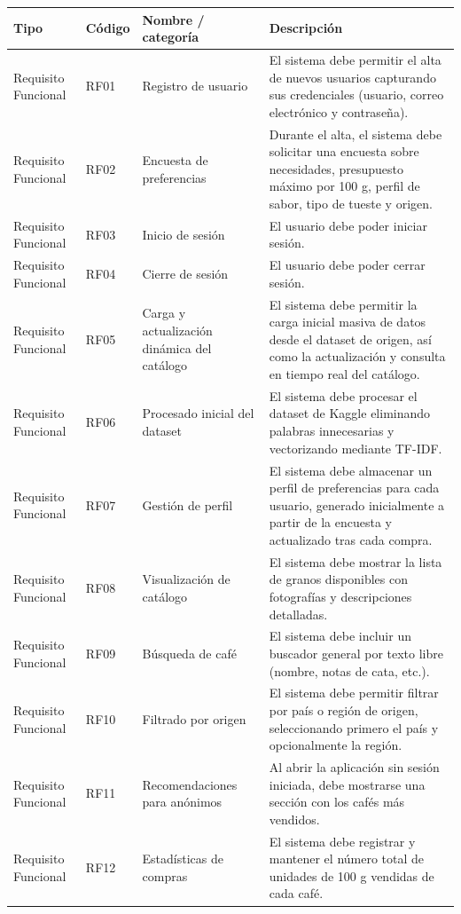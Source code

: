 \begin{longtable}{p{2.8cm}p{1.1cm}p{4.1cm}p{7cm}}
\hline
\textbf{Tipo} & \textbf{Código} & \textbf{Nombre / categoría} & \textbf{Descripción}\\
\hline
\endhead
Requisito Funcional & RF01 & Registro de usuario & El sistema debe permitir el alta de nuevos usuarios capturando sus credenciales (usuario, correo electrónico y contraseña).\\
Requisito Funcional & RF02 & Encuesta de preferencias & Durante el alta, el sistema debe solicitar una encuesta sobre necesidades, presupuesto máximo por 100 g, perfil de sabor, tipo de tueste y origen.\\
Requisito Funcional & RF03 & Inicio de sesión & El usuario debe poder iniciar sesión.\\
Requisito Funcional & RF04 & Cierre de sesión & El usuario debe poder cerrar sesión.\\
Requisito Funcional & RF05 & Carga y actualización dinámica del catálogo & El sistema debe permitir la carga inicial masiva de datos desde el dataset de origen, así como la actualización y consulta en tiempo real del catálogo.\\
Requisito Funcional & RF06 & Procesado inicial del dataset & El sistema debe procesar el dataset de Kaggle eliminando palabras innecesarias y vectorizando mediante TF-IDF.\\
Requisito Funcional & RF07 & Gestión de perfil & El sistema debe almacenar un perfil de preferencias para cada usuario, generado inicialmente a partir de la encuesta y actualizado tras cada compra.\\
Requisito Funcional & RF08 & Visualización de catálogo & El sistema debe mostrar la lista de granos disponibles con fotografías y descripciones detalladas.\\
Requisito Funcional & RF09 & Búsqueda de café & El sistema debe incluir un buscador general por texto libre (nombre, notas de cata, etc.).\\
Requisito Funcional & RF10 & Filtrado por origen & El sistema debe permitir filtrar por país o región de origen, seleccionando primero el país y opcionalmente la región.\\
Requisito Funcional & RF11 & Recomendaciones para anónimos & Al abrir la aplicación sin sesión iniciada, debe mostrarse una sección con los cafés más vendidos.\\
Requisito Funcional & RF12 & Estadísticas de compras & El sistema debe registrar y mantener el número total de unidades de 100 g vendidas de cada café.\\

\end{longtable}
